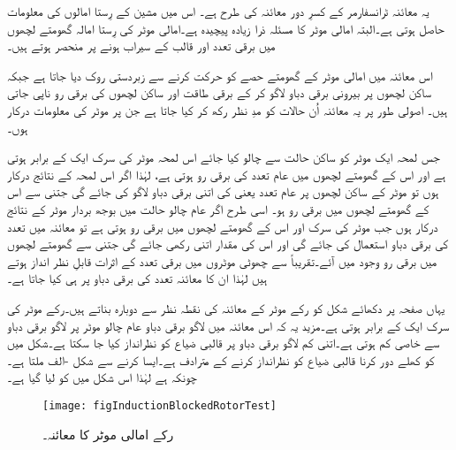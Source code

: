 یہ معائنہ ٹرانسفارمر کے کسرِ دور معائنہ کی طرح ہے۔ اس میں مشین کے رِستا امالوں کی معلومات حاصل ہوتی ہے۔البتہ امالی موٹر کا مسئلہ ذرا زیادہ پیچیدہ ہے۔امالی موٹر کی رِستا امالہ گھومتے لچھوں میں برقی تعدد اور قالب کے سیراب ہونے پر منحصر ہوتے ہیں۔

 اس معائنہ میں امالی موٹر کے گھومتے حصے کو حرکت کرنے سے زبردستی روک دیا جاتا ہے جبکہ ساکن لچھوں پر بیرونی برقی دباو  لاگو کر کے برقی طاقت  اور ساکن لچھوں کی برقی رو  ناپی جاتی ہیں۔ اصولی طور پر یہ معائنہ اُن حالات کو مدِ نظر رکھ کر کیا جاتا ہے جن پر موٹر کی معلومات درکار ہوں۔

جس لمحہ ایک موٹر کو ساکن حالت سے چالو کیا جائے اس لمحہ موٹر کی سرک ایک کے برابر ہوتی ہے اور اس کے گھومتے لچھوں میں عام تعدد   کی برقی رو  ہوتی ہے، لہٰذا اگر اس لمحہ کے نتائج درکار ہوں تو موٹر کے ساکن لچھوں پر عام تعدد یعنی   کی اتنی برقی دباو لاگو کی جائے گی جتنی سے اس کے گھومتے لچھوں میں برقی رو  ہو۔ اسی طرح اگر عام چالو حالت میں بوجھ بردار موٹر کے نتائج درکار ہوں جب موٹر کی سرک  اور اس کے گھومتے لچھوں میں برقی رو  ہوتی ہے تو معائنہ میں  تعدد کی برقی دباو استعمال کی جائے گی اور اس کی مقدار اتنی رکھی جائے گی جتنی سے گھومتے لچھوں میں  برقی رو وجود میں آئے۔تقریباً   سے چھوٹی موٹروں میں برقی تعدد کے اثرات قابلِ نظر انداز ہوتے ہیں لہٰذا ان کا معائنہ  تعدد کی برقی دباو پر ہی کیا جاتا ہے۔

یہاں صفحہ  پر دکھائے شکل   کو رکے موٹر کے معائنہ کی نقطہ نظر سے دوبارہ بناتے ہیں۔رکے موٹر کی سرک ایک کے برابر ہوتی ہے۔مزید یہ کہ اس معائنہ میں لاگو برقی دباو عام چالو موٹر پر لاگو برقی دباو سے خاصی کم ہوتی ہے۔اتنی کم لاگو برقی دباو پر قالبی ضیاع کو نظرانداز کیا جا سکتا ہے۔شکل میں   کو کھلے دور کرنا قالبی ضیاع کو نظرانداز کرنے کے مترادف ہے۔ایسا کرنے سے شکل -الف ملتا ہے۔چونکہ  ہے لہٰذا اس شکل میں   کو  لیا گیا ہے۔
\begin{figure}
\centering
\texttt{[image: figInductionBlockedRotorTest]}
\caption{رکے امالی موٹر کا معائنہ۔}
\label{شکل_امالی_رکے_موٹر_معائنہ}
\end{figure}

